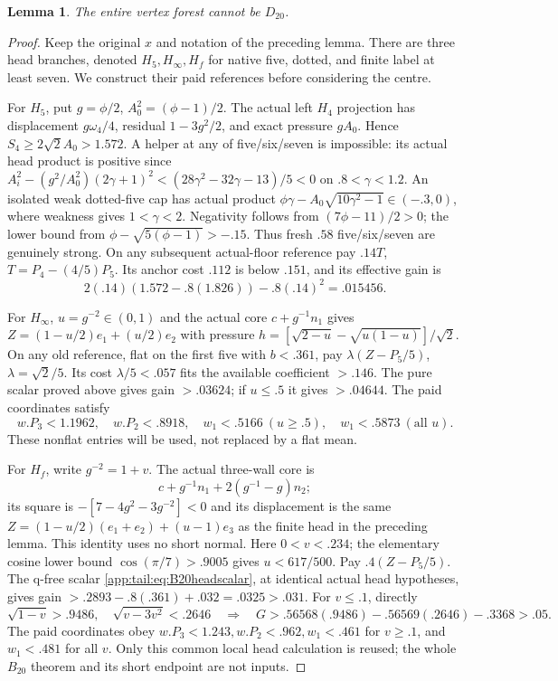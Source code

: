 \documentclass[11pt]{article}
\newtheorem{lemma}[theorem]{Lemma}
\theoremstyle{definition}
\theoremstyle{remark}
\begin{document}
\begin{lemma}\label{app:tail:lem:wholeD20}
The entire vertex forest cannot be $D_{20}$.
\end{lemma}
\begin{proof}
Keep the original $x$ and notation of the preceding lemma. There
are three head branches, denoted $H_5,H_\infty,H_f$ for native
five, dotted, and finite label at least seven. We construct their
paid references before considering the centre.

For $H_5$, put $g=\phi/2$, $A_0^2=(\phi-1)/2$.
The actual left $H_4$ projection has displacement
$g\omega_4/4$, residual $1-3g^2/2$, and exact pressure
$gA_0$. Hence $S_4\ge2\sqrt2A_0>1.572$.
A helper at any of five/six/seven is impossible: its actual
head product is positive since
$A_i^2-(g^2/A_0^2)(2\gamma+1)^2
<(28\gamma^2-32\gamma-13)/5<0$ on $.8<\gamma<1.2$.
An isolated weak dotted-five cap has actual product
$\phi\gamma-A_0\sqrt{10\gamma^2-1}\in(-.3,0)$,
where weakness gives $1<\gamma<2$.
Negativity follows from $(7\phi-11)/2>0$;
the lower bound from $\phi-\sqrt{5(\phi-1)}>-.15$.
Thus fresh $.58$ five/six/seven are genuinely strong.
On any subsequent actual-floor reference pay
$.14T$, $T=P_4-(4/5)P_5$.
Its anchor cost $.112$ is below $.151$, and its effective gain is
\[
 2(.14)(1.572-.8(1.826))-.8(.14)^2=.015456.
\]

For $H_\infty$, $u=g^{-2}\in(0,1)$ and the actual core
$c+g^{-1}n_1$ gives
$Z=(1-u/2)e_1+(u/2)e_2$ with pressure
$h=[\sqrt{2-u}-\sqrt{u(1-u)}]/\sqrt2$.
On any old reference, flat on the first five with $b<.361$,
pay $\lambda(Z-P_5/5)$, $\lambda=\sqrt2/5$.
Its cost $\lambda/5<.057$ fits the available coefficient
$>.146$. The pure scalar proved above gives gain $>.03624$;
if $u\le.5$ it gives $>.04644$.
The paid coordinates satisfy
\[
 w.P_3<1.1962,\quad w.P_2<.8918,\quad
 w_1<.5166\ (u\ge.5),\quad w_1<.5873\ (\text{all }u).
\]
These nonflat entries will be used, not replaced by a flat mean.

For $H_f$, write $g^{-2}=1+v$. The actual three-wall core is
\[
 c+g^{-1}n_1+2(g^{-1}-g)n_2;
\]
its square is $-[7-4g^2-3g^{-2}]<0$ and its displacement is
the same $Z=(1-u/2)(e_1+e_2)+(u-1)e_3$ as the finite head
in the preceding lemma. This identity uses no short normal.
Here $0<v<.234$; the elementary cosine lower bound
$\cos(\pi/7)>.9005$ gives $u<617/500$.
Pay $.4(Z-P_5/5)$. The q-free scalar
\eqref{app:tail:eq:B20headscalar}, at identical actual head
hypotheses, gives gain
$>.2893-.8(.361)+.032=.0325>.031$.
For $v\le.1$, directly
\[
 \sqrt{1-v}>.9486,\quad \sqrt{v-3v^2}<.2646
 \quad\Longrightarrow\quad
 G>.56568(.9486)-.56569(.2646)-.3368>.05.
\]
The paid coordinates obey
$w.P_3<1.243,w.P_2<.962,w_1<.461$ for $v\ge.1$,
and $w_1<.481$ for all $v$.
Only this common local head calculation is reused; the whole
$B_{20}$ theorem and its short endpoint are not inputs.


\end{proof}
\end{document}
